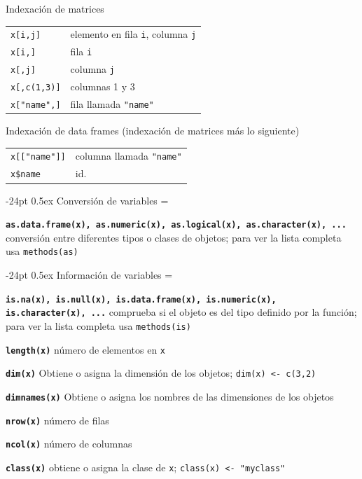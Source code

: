 \documentclass[10pt,landscape]{article}
\makeatletter
\renewcommand\section{\@startsection{section}{1}{0mm}%
                                     {-24pt}%
                                     {0.5ex}%
                                {\color[rgb]{1,0.54902,0}\normalfont\large\bfseries}}
\newcommand{\code}{\texttt}
\newcommand{\bcode}[1]{\texttt{\textbf{#1}}}
\makeatother
\begin{document}
\begin{multicols*}{3}
Indexación de matrices

\begin{tabular}{@{}l@{\ }l}
\code{x[i,j]} & elemento en fila \code{i}, columna \code{j}\\
\code{x[i,]} & fila \code{i}\\
\code{x[,j]} & columna \code{j}\\
\code{x[,c(1,3)]} & columnas 1 y 3\\
\code{x["name",]} & fila llamada \code{"name"}\\
\end{tabular}

Indexación de data frames (indexación de matrices más lo siguiente)

\begin{tabular}{@{}l@{\ }l}
\code{x[["name"]]} & columna llamada \code{"name"}\\
\code{x\$name} & id.
\end{tabular}



\section{Conversión de variables} 
\everypar={\hangindent=9mm}

\bcode{as.data.frame(x), as.numeric(x), as.logical(x),
  as.character(x), ...} conversión entre diferentes tipos o clases de objetos; para ver la lista completa usa   \code{methods(as)}




\section{Información de variables} 
\everypar={\hangindent=9mm}

\bcode{is.na(x), is.null(x), is.data.frame(x), 
	is.numeric(x), is.character(x), ...} comprueba si el objeto es del tipo definido por la función; para ver la lista completa usa \code{methods(is)}

\bcode{length(x)}  número de elementos en \code{x}

\bcode{dim(x)} Obtiene o asigna la dimensión de los objetos; 
\code{dim(x) <- c(3,2)}

\bcode{dimnames(x)} Obtiene o asigna los nombres de las dimensiones de los objetos

\bcode{nrow(x)} número de filas

\bcode{ncol(x)} número de columnas

\bcode{class(x)} obtiene o asigna la clase de \code{x}; \code{class(x) <- "myclass"}


\end{multicols*}
\end{document}
